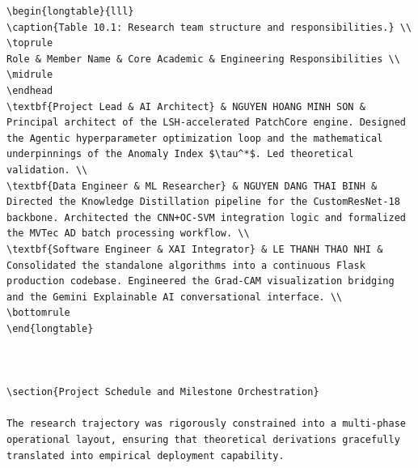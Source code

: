 \documentclass[12pt,a4paper,oneside]{report}
\begin{document}
\begin{verbatim}
\begin{longtable}{lll}
\caption{Table 10.1: Research team structure and responsibilities.} \\
\toprule
Role & Member Name & Core Academic & Engineering Responsibilities \\
\midrule
\endhead
\textbf{Project Lead & AI Architect} & NGUYEN HOANG MINH SON & Principal architect of the LSH-accelerated PatchCore engine. Designed the Agentic hyperparameter optimization loop and the mathematical underpinnings of the Anomaly Index $\tau^*$. Led theoretical validation. \\
\textbf{Data Engineer & ML Researcher} & NGUYEN DANG THAI BINH & Directed the Knowledge Distillation pipeline for the CustomResNet-18 backbone. Architected the CNN+OC-SVM integration logic and formalized the MVTec AD batch processing workflow. \\
\textbf{Software Engineer & XAI Integrator} & LE THANH THAO NHI & Consolidated the standalone algorithms into a continuous Flask production codebase. Engineered the Grad-CAM visualization bridging and the Gemini Explainable AI conversational interface. \\
\bottomrule
\end{longtable}



\section{Project Schedule and Milestone Orchestration}

The research trajectory was rigorously constrained into a multi-phase operational layout, ensuring that theoretical derivations gracefully translated into empirical deployment capability.


\end{verbatim}
\end{document}
